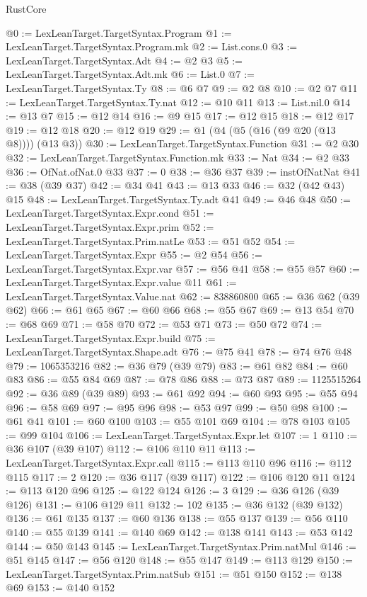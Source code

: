 \begin{lexlean}{RustCore}
\begin{coremodule}
@0 := LexLeanTarget.TargetSyntax.Program
@1 := LexLeanTarget.TargetSyntax.Program.mk
@2 := List.cons.{0}
@3 := LexLeanTarget.TargetSyntax.Adt
@4 := @2 @3
@5 := LexLeanTarget.TargetSyntax.Adt.mk
@6 := List.{0}
@7 := LexLeanTarget.TargetSyntax.Ty
@8 := @6 @7
@9 := @2 @8
@10 := @2 @7
@11 := LexLeanTarget.TargetSyntax.Ty.nat
@12 := @10 @11
@13 := List.nil.{0}
@14 := @13 @7
@15 := @12 @14
@16 := @9 @15
@17 := @12 @15
@18 := @12 @17
@19 := @12 @18
@20 := @12 @19
@29 := @1 (@4 (@5 (@16 (@9 @20 (@13 @8)))) (@13 @3))
@30 := LexLeanTarget.TargetSyntax.Function
@31 := @2 @30
@32 := LexLeanTarget.TargetSyntax.Function.mk
@33 := Nat
@34 := @2 @33
@36 := OfNat.ofNat.{0} @33
@37 := 0
@38 := @36 @37
@39 := instOfNatNat
@41 := @38 (@39 @37)
@42 := @34 @41
@43 := @13 @33
@46 := @32 (@42 @43) @15
@48 := LexLeanTarget.TargetSyntax.Ty.adt @41
@49 := @46 @48
@50 := LexLeanTarget.TargetSyntax.Expr.cond
@51 := LexLeanTarget.TargetSyntax.Expr.prim
@52 := LexLeanTarget.TargetSyntax.Prim.natLe
@53 := @51 @52
@54 := LexLeanTarget.TargetSyntax.Expr
@55 := @2 @54
@56 := LexLeanTarget.TargetSyntax.Expr.var
@57 := @56 @41
@58 := @55 @57
@60 := LexLeanTarget.TargetSyntax.Expr.value @11
@61 := LexLeanTarget.TargetSyntax.Value.nat
@62 := 838860800
@65 := @36 @62 (@39 @62)
@66 := @61 @65
@67 := @60 @66
@68 := @55 @67
@69 := @13 @54
@70 := @68 @69
@71 := @58 @70
@72 := @53 @71
@73 := @50 @72
@74 := LexLeanTarget.TargetSyntax.Expr.build
@75 := LexLeanTarget.TargetSyntax.Shape.adt
@76 := @75 @41
@78 := @74 @76 @48
@79 := 1065353216
@82 := @36 @79 (@39 @79)
@83 := @61 @82
@84 := @60 @83
@86 := @55 @84 @69
@87 := @78 @86
@88 := @73 @87
@89 := 1125515264
@92 := @36 @89 (@39 @89)
@93 := @61 @92
@94 := @60 @93
@95 := @55 @94
@96 := @58 @69
@97 := @95 @96
@98 := @53 @97
@99 := @50 @98
@100 := @61 @41
@101 := @60 @100
@103 := @55 @101 @69
@104 := @78 @103
@105 := @99 @104
@106 := LexLeanTarget.TargetSyntax.Expr.let
@107 := 1
@110 := @36 @107 (@39 @107)
@112 := @106 @110 @11
@113 := LexLeanTarget.TargetSyntax.Expr.call
@115 := @113 @110 @96
@116 := @112 @115
@117 := 2
@120 := @36 @117 (@39 @117)
@122 := @106 @120 @11
@124 := @113 @120 @96
@125 := @122 @124
@126 := 3
@129 := @36 @126 (@39 @126)
@131 := @106 @129 @11
@132 := 102
@135 := @36 @132 (@39 @132)
@136 := @61 @135
@137 := @60 @136
@138 := @55 @137
@139 := @56 @110
@140 := @55 @139
@141 := @140 @69
@142 := @138 @141
@143 := @53 @142
@144 := @50 @143
@145 := LexLeanTarget.TargetSyntax.Prim.natMul
@146 := @51 @145
@147 := @56 @120
@148 := @55 @147
@149 := @113 @129
@150 := LexLeanTarget.TargetSyntax.Prim.natSub
@151 := @51 @150
@152 := @138 @69
@153 := @140 @152

\end{coremodule}
\end{lexlean}
